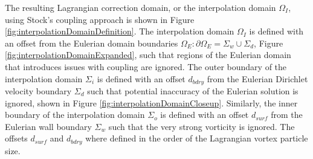 	The resulting Lagrangian correction domain, or the interpolation domain $\Omega_I$, using Stock's coupling approach is shown in Figure \ref{fig:interpolationDomainDefinition}. The interpolation domain $\Omega_I$ is defined with an offset from the Eulerian domain boundaries $\Omega_E: \partial\Omega_E=\Sigma_w \cup \Sigma_d$, Figure \ref{fig:interpolationDomainExpanded}, such that regions of the Eulerian domain that introduces issues with coupling are ignored. The outer boundary of the interpolation domain $\Sigma_i$ is defined with an offset $d_{bdry}$ from the Eulerian Dirichlet velocity boundary $\Sigma_d$ such that potential inaccuracy of the Eulerian solution is ignored, shown in Figure \ref{fig:interpolationDomainCloseup}. Similarly, the inner boundary of the interpolation domain $\Sigma_o$ is defined with an offset $d_{surf}$ from the Eulerian wall boundary $\Sigma_w$ such that the very strong vorticity is ignored. The offsets $d_{surf}$ and $d_{bdry}$  where defined in the order of the Lagrangian vortex particle size.
	
